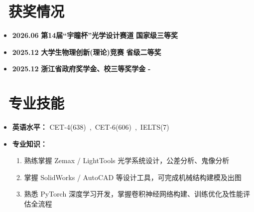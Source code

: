 \documentclass[11pt]{article}
\begin{document}
\section{\makebox[\widthof{\faCogs}][c]{\color{CVBlue}\faCogs}\ 获奖情况}
\begin{itemize}[leftmargin=0pt, itemsep=0.3em]
    \item \textbf{2026.06} \hfill \textbf{第14届“宇瞳杯”光学设计赛道} \hfill \textbf{国家级三等奖}
    \item \textbf{2025.12} \hfill \textbf{大学生物理创新(理论)竞赛} \hfill \textbf{省级二等奖}
    \item \textbf{2025.12} \hfill \textbf{浙江省政府奖学金、校三等奖学金   \quad} \hfill \textbf{-}
\end{itemize}
    
\section{\makebox[\widthof{\faCogs}][c]{\color{CVBlue}\faCogs}\ 专业技能}
\begin{itemize}[leftmargin=*, parsep=0.5ex]
    \item \textbf{英语水平：} CET-4(638)\ ,\ CET-6(606)\ ,\ IELTS(7)
    \item \textbf{专业知识：}
    \begin{enumerate}[label=\arabic*., leftmargin=1.5em, parsep=0ex, topsep=0.5ex]
        \item 熟练掌握 Zemax / LightTools 光学系统设计，公差分析、鬼像分析
        \item 掌握 SolidWorks / AutoCAD 等设计工具，可完成机械结构建模及出图
        \item 熟悉 PyTorch 深度学习开发，掌握卷积神经网络构建、训练优化及性能评估全流程
    \end{enumerate}
\end{itemize}
\end{document}
